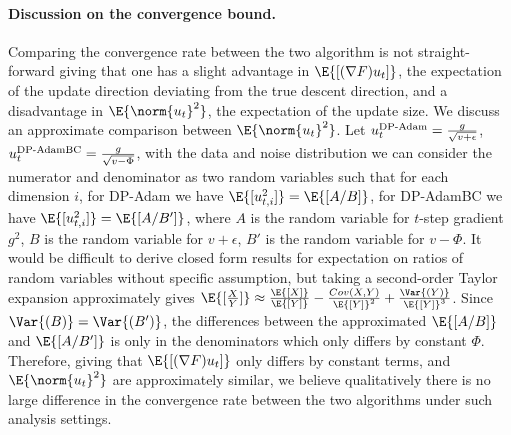 \documentclass[letterpaper]{article} %
\begin{document}
\paragraph{Discussion on the convergence bound.}
Comparing the convergence rate between the two algorithm is not straight-forward giving that one has a slight advantage in $\E{[(\nabla F) u_t]}$, the expectation of the update direction deviating from the true descent direction, and a disadvantage in $\E{\norm{u_t}^2}$, the expectation of the update size. We discuss an approximate comparison between $\E{\norm{u_t}^2}$. Let $u_t^{\textnormal{DP-Adam}}=\frac{g}{\sqrt{v+\epsilon}}$, $u_t^{\textnormal{DP-AdamBC}}=\frac{g}{\sqrt{v-\Phi}}$, with the data and noise distribution we can consider the numerator and denominator as two random variables such that for each dimension $i$, for DP-Adam we have $\E{[u_{t, i}^2]} = \E{[A/B]}$, for DP-AdamBC we have $\E{[u_{t, i}^2]} = \E{[A/B']}$, where $A$ is the random variable for $t$-step gradient $g^2$, $B$ is the random variable for $v+\epsilon$, $B'$ is the random variable for $v-\Phi$. It would be difficult to derive closed form results for expectation on ratios of random variables without specific assumption, but taking a second-order Taylor expansion approximately gives $\E{[\frac{X}{Y}]} \approx \frac{\E{[X]}}{\E{[Y]}}-\frac{Cov(X,Y)}{\E{[Y]}^2}+\frac{\Var{(Y)}}{\E{[Y]}^3}$. Since $\Var{(B)}=\Var{(B')}$, the differences between the approximated $\E{[A/B]}$ and $\E{[A/B']}$ is only in the denominators which only differs by constant $\Phi$. Therefore, giving that $\E{[(\nabla F) u_t]}$ only differs by constant terms, and $\E{\norm{u_t}^2}$ are approximately similar, we believe qualitatively there is no large difference in the convergence rate between the two algorithms under such analysis settings.
\end{document}
